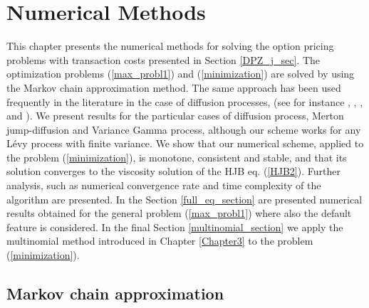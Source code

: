 

\chapter{Numerical Methods}\label{Chapter6}
\minitoc%

\vspace{5em}


This chapter presents the numerical methods for solving the option pricing problems with transaction costs presented in Section \ref{DPZ_j_sec}.
The optimization problems (\ref{max_probl1}) and (\ref{minimization}) are solved by using the Markov chain approximation method. The same approach has been used 
frequently in the literature in the case of diffusion processes, (see for instance \cite{HoNe89}, \cite{DaPaZa93}, \cite{Damgaard}, \cite{Mon04} and \cite{Pal15}). 
We present results for the particular cases of diffusion process, Merton jump-diffusion and Variance Gamma process, although our scheme works for any Lévy process with finite variance. 
We show that our numerical scheme, applied to the problem (\ref{minimization}), is monotone, consistent and stable, and that its solution converges to the viscosity solution of the  
HJB eq. (\ref{HJB2}).
Further analysis, such as numerical convergence rate and time complexity of the algorithm are presented.
In the Section \ref{full_eq_section} are presented numerical results obtained for the general problem (\ref{max_probl1}) where also the default feature is considered.
In the final Section \ref{multinomial_section} we apply the multinomial method introduced in Chapter \ref{Chapter3} to the problem (\ref{minimization}).




\section{Markov chain approximation} \label{MC_section}

